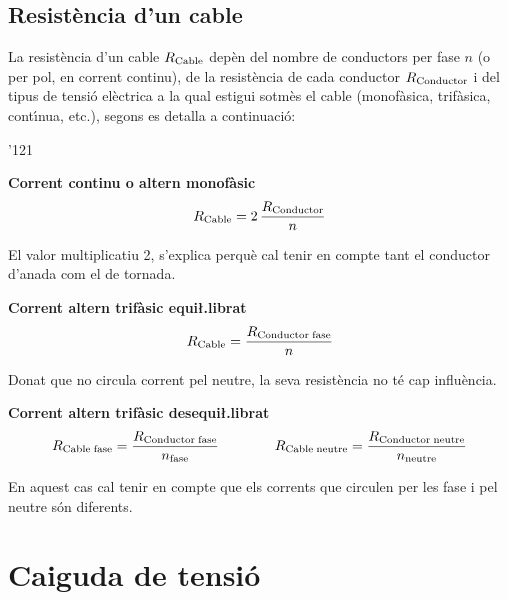 \subsection{Resist\`{e}ncia d'un cable}

La resist\`{e}ncia d'un cable $R_\mathrm{Cable}$ dep\`{e}n del nombre de conductors per fase $n$ (o
per pol, en corrent continu), de la resist\`{e}ncia de cada conductor $R_\mathrm{Conductor}$ i del
tipus de tensi\'{o} el\`{e}ctrica a la qual estigui sotm\`{e}s el cable (monof\`{a}sica, trif\`{a}sica,
cont\'{\i}nua, etc.), segons es detalla a continuaci\'{o}:

\begin{dinglist}{'121}
    \item \textbf{Corrent continu o altern monof\`{a}sic}
    \begin{equation}\label{eq:r_cc_mono}
    R_\mathrm{Cable} = 2\, \frac{R_\mathrm{Conductor}}{n}
    \end{equation}

    El valor multiplicatiu 2, s'explica perqu\`{e} cal tenir en compte tant el conductor d'anada
    com el de tornada. \vspace{0.5cm}

    \item \textbf{Corrent altern trif\`{a}sic equi{\l.l}ibrat}
    \begin{equation}\label{eq:r_trifas}
    R_\mathrm{Cable} = \frac{R_\mathrm{Conductor\;fase}}{n}
    \end{equation}

    Donat que no circula corrent pel neutre, la seva resist\`{e}ncia no t\'{e} cap influ\`{e}ncia.
    \vspace{0.5cm}

    \item \textbf{Corrent altern trif\`{a}sic desequi{\l.l}ibrat}
    \begin{equation}
    R_\mathrm{Cable\;fase} = \frac{R_\mathrm{Conductor\;fase}}{n_\mathrm{fase}} \qquad\qquad
    R_\mathrm{Cable\; neutre} = \frac{R_\mathrm{Conductor\;neutre}}{n_\mathrm{neutre}}
    \end{equation}

    En aquest cas cal tenir en compte que els corrents que circulen per les fase i pel neutre
    s\'{o}n diferents.
\end{dinglist}


\section{Caiguda de tensi\'{o}}

